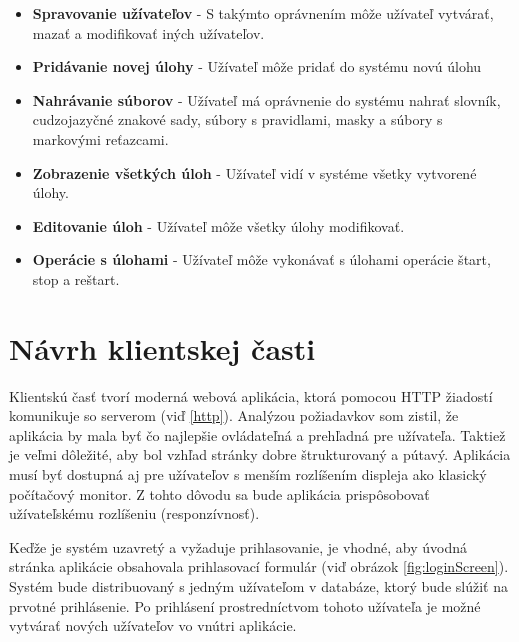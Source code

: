 \documentclass[slovak]{fitthesis}
\begin{document}
\begin{itemize}
    \item \textbf{Spravovanie užívateľov} - S takýmto oprávnením môže užívateľ vytvárať, mazať a modifikovať iných užívateľov.
    \item \textbf{Pridávanie novej úlohy} - Užívateľ môže pridať do systému novú úlohu
    \item \textbf{Nahrávanie súborov} - Užívateľ má oprávnenie do systému nahrať slovník, cudzojazyčné znakové sady, súbory s pravidlami, masky a súbory s markovými reťazcami. 
    \item \textbf{Zobrazenie všetkých úloh} - Užívateľ vidí v systéme všetky vytvorené úlohy.
    \item \textbf{Editovanie úloh} - Užívateľ môže všetky úlohy modifikovať.
    \item \textbf{Operácie s úlohami} - Užívateľ môže vykonávať s úlohami operácie štart, stop a reštart.
\end{itemize}





\section{Návrh klientskej časti}\label{navrhKlient}
Klientskú časť tvorí moderná webová aplikácia, ktorá pomocou HTTP žiadostí komunikuje so serverom (viď \ref{http}). Analýzou požiadavkov som zistil, že aplikácia by mala byť čo najlepšie ovládateľná a prehľadná pre užívateľa. Taktiež je veľmi dôležité, aby bol vzhľad stránky dobre štrukturovaný a pútavý. Aplikácia musí byť dostupná aj pre užívateľov s menším rozlíšením displeja ako klasický počítačový monitor. Z tohto dôvodu sa bude aplikácia prispôsobovať užívateľskému rozlíšeniu (responzívnosť).

Keďže je systém uzavretý a vyžaduje prihlasovanie, je vhodné, aby úvodná stránka aplikácie obsahovala prihlasovací formulár (viď obrázok \ref{fig:loginScreen}). Systém bude distribuovaný s jedným užívateľom v databáze, ktorý bude slúžiť na prvotné prihlásenie. Po prihlásení prostredníctvom tohoto užívateľa je možné vytvárať nových užívateľov vo vnútri aplikácie.
\end{document}
